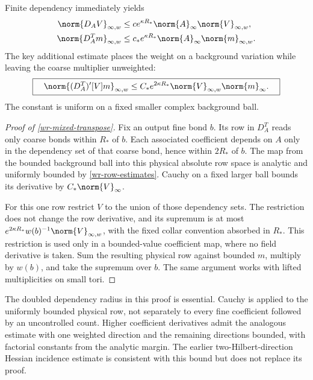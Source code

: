 Finite dependency immediately yields
\begin{equation}\label{wr-weighted-rows}
 \begin{split}
 \norm{D_AV}_{\infty,w}
 &\le ce^{\kappa R_*}\norm{A}_\infty\norm{V}_{\infty,w},\\
 \norm{D_A^Tm}_{\infty,w}
 &\le c_*e^{\kappa R_*}\norm{A}_\infty\norm{m}_{\infty,w}.
 \end{split}
\end{equation}
The key additional estimate places the weight on a background
variation while leaving the coarse multiplier unweighted:
\begin{equation}\label{wr-mixed-transpose}
 \boxed{\quad
 \norm{(D_A^T)'[V]m}_{\infty,w}
 \le C_*e^{2\kappa R_*}\norm{V}_{\infty,w}\norm{m}_\infty.
 \quad}
\end{equation}
The constant is uniform on a fixed smaller complex background
ball.

\begin{proof}[Proof of \eqref{wr-mixed-transpose}]
Fix an output fine bond $b$. Its row in $D_A^T$ reads only coarse
bonds within $R_*$ of $b$. Each associated coefficient depends on
$A$ only in the dependency set of that coarse bond, hence within
$2R_*$ of $b$. The map from the bounded background ball into this
physical absolute row space is analytic and uniformly bounded
by \eqref{wr-row-estimates}. Cauchy on a fixed larger ball bounds
its derivative by $C_*\norm{V}_\infty$.

For this one row restrict $V$ to the union of those dependency
sets. The restriction does not change the row derivative, and its
supremum is at most
$e^{2\kappa R_*}w(b)^{-1}\norm{V}_{\infty,w}$, with the fixed
collar convention absorbed in $R_*$. This restriction is used
only in a bounded-value coefficient map, where no field derivative
is taken. Sum the resulting physical row against bounded $m$,
multiply by $w(b)$, and take the supremum over $b$.
The same argument works with lifted multiplicities on small tori.
\end{proof}

The doubled dependency radius in this proof is essential.
Cauchy is applied to the uniformly bounded physical row, not
separately to every fine coefficient followed by an uncontrolled
count. Higher coefficient derivatives admit the analogous estimate
with one weighted direction and the remaining directions bounded,
with factorial constants from the analytic margin. The earlier
two-Hilbert-direction Hessian incidence estimate is consistent
with this bound but does not replace its proof.

